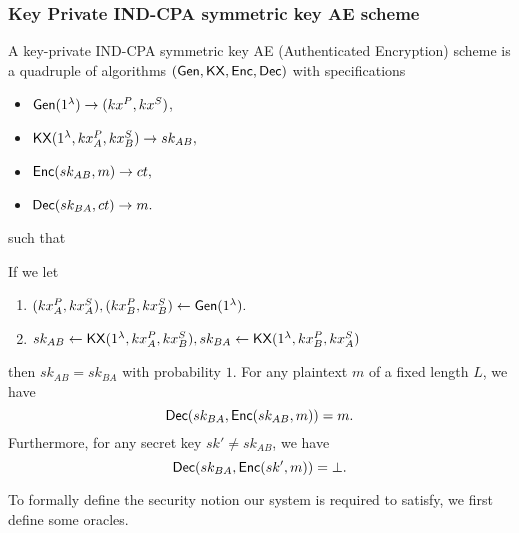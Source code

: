 \subsubsection{Key Private IND-CPA symmetric key AE scheme}
A key-private IND-CPA symmetric key AE (Authenticated Encryption) scheme is a quadruple of algorithms $(\mathsf{Gen}, \mathsf{KX}, \mathsf{Enc}, \mathsf{Dec})$ with specifications
\begin{itemize}
    \item $\mathsf{Gen}(1^{\lambda}) \to (kx^P, kx^S)$,
    \item $\mathsf{KX}(1^{\lambda}, kx_A^P, kx_B^S) \to sk_{AB},$
    \item $\mathsf{Enc}(sk_{AB}, m) \to ct,$
    \item $\mathsf{Dec}(sk_{BA}, ct) \to m.$
\end{itemize}
such that 
\begin{definition}[Correctness]
\label{defn:KX-Correctness}
If we let
\begin{enumerate}
    \item $(kx^P_A, kx_A^S), (kx^P_B, kx_B^S)  \leftarrow \mathsf{Gen}(1^{\lambda}).$
    \item $sk_{AB} \leftarrow \mathsf{KX}(1^{\lambda}, kx_A^P, kx_B^S), sk_{BA} \leftarrow \mathsf{KX}(1^{\lambda}, kx_B^P, kx_A^S)$
\end{enumerate}
then $sk_{AB} = sk_{BA}$ with probability $1$. For any plaintext $m$ of a fixed length $L$, we have
$$\mathsf{Dec}(sk_{BA}, \mathsf{Enc}(sk_{AB}, m)) = m.$$
Furthermore, for any secret key $sk' \neq sk_{AB}$, we have
$$\mathsf{Dec}(sk_{BA}, \mathsf{Enc}(sk', m)) = \bot.$$

\end{definition}

To formally define the security notion our system is required to satisfy, we first define some oracles.

